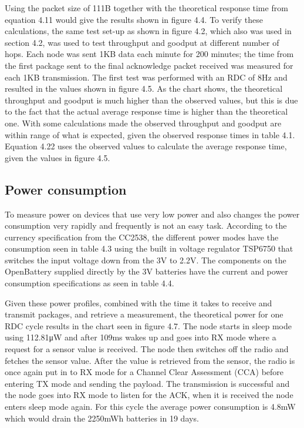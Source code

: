 Using the packet size of 111B together with the theoretical response time from equation 4.11 would give the results shown in figure 4.4.
To verify these calculations,
	the same test set-up as shown in figure 4.2,
	which also was used in section 4.2,
	was used to test throughput and goodput at different number of hops.
Each node was sent 1KB data each minute for 200 minutes;
	the time from the first package sent to the final acknowledge packet received was measured for each 1KB transmission.
The first test was performed with an RDC of 8Hz and resulted in the values shown in figure 4.5.
As the chart shows,
	the theoretical throughput and goodput is much higher than the observed values,
	but this is due to the fact that the actual average response time is higher than the theoretical one.
With some calculations made the observed throughput and goodput are within range of what is expected,
	given the observed response times in table 4.1.
Equation 4.22 uses the observed values to calculate the average response time,
	given the values in figure 4.5.

\subsection{Power consumption}

To measure power on devices that use very low power and also changes the power consumption very rapidly and frequently is not an easy task.
According to the currency specification from the CC2538,
	the different power modes have the consumption seen in table 4.3 using the built in voltage regulator TSP6750 that switches the input voltage down from the 3V to 2.2V.
The components on the OpenBattery supplied directly by the 3V batteries have the current and power consumption specifications as seen in table 4.4.


Given these power profiles,
	combined with the time it takes to receive and transmit packages,
	and retrieve a measurement,
	the theoretical power for one RDC cycle results in the chart seen in figure 4.7.
The node starts in sleep mode using 112.81μW and after 109ms wakes up and goes into RX mode where a request for a sensor value is received.
The node then switches off the radio and fetches the sensor value.
After the value is retrieved from the sensor,
	the radio is once again put in to RX mode for a Channel Clear Assessment (CCA) before entering TX mode and sending the payload.
The transmission is successful and the node goes into RX mode to listen for the ACK,
	when it is received the node enters sleep mode again.
For this cycle the average power consumption is 4.8mW which would drain the 2250mWh batteries in 19 days.

